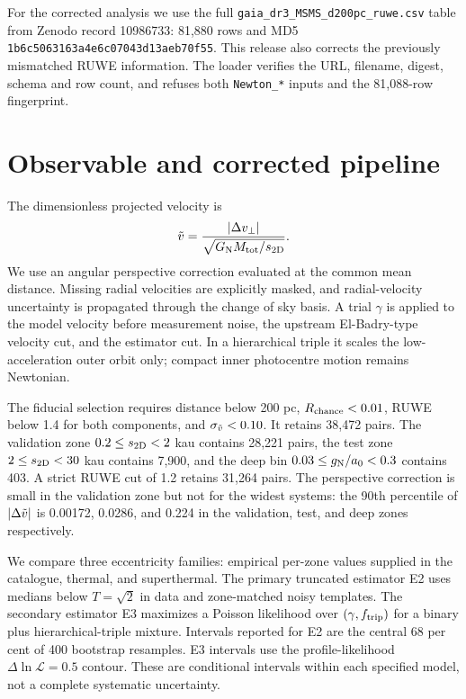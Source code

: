For the corrected analysis we use the full
\texttt{gaia\_dr3\_MSMS\_d200pc\_ruwe.csv} table from Zenodo record 10986733:
81,880 rows and MD5 \texttt{1b6c5063163a4e6c07043d13aeb70f55}.  This release
also corrects the previously mismatched RUWE information.  The loader verifies
the URL, filename, digest, schema and row count, and refuses both
\texttt{Newton\_*} inputs and the 81,088-row fingerprint.

\section{Observable and corrected pipeline}
The dimensionless projected velocity is
\begin{equation}
 \tilde{v}=\frac{|\Delta v_\perp|}{\sqrt{G_{\rm N}M_{\rm tot}/s_{\rm 2D}}}.
\end{equation}
We use an angular perspective correction evaluated at the common mean distance.
Missing radial velocities are explicitly masked, and radial-velocity
uncertainty is propagated through the change of sky basis.  A trial $\gamma$
is applied to the model velocity before measurement noise, the upstream
El-Badry-type velocity cut, and the estimator cut.  In a hierarchical triple it
scales the low-acceleration outer orbit only; compact inner photocentre motion
remains Newtonian.

The fiducial selection requires distance below 200 pc,
$R_{\rm chance}<0.01$, RUWE below 1.4 for both components, and
$\sigma_{\tilde{v}}<0.10$.  It retains 38,472 pairs.  The validation zone
$0.2\le s_{\rm 2D}<2$ kau contains 28,221 pairs, the test zone
$2\le s_{\rm 2D}<30$ kau contains 7,900, and the deep bin
$0.03\le g_{\rm N}/a_0<0.3$ contains 403.  A strict RUWE cut of 1.2 retains 31,264
pairs.  The perspective correction is small in the validation zone but not for
the widest systems: the 90th percentile of $|\Delta\tilde{v}|$ is 0.00172, 0.0286,
and 0.224 in the validation, test, and deep zones respectively.

We compare three eccentricity families: empirical per-zone values supplied in
the catalogue, thermal, and superthermal.  The primary truncated estimator E2
uses medians below $T=\sqrt{2}$ in data and zone-matched noisy templates.  The
secondary estimator E3 maximizes a Poisson likelihood over $(\gamma,f_{\rm trip})$
for a binary plus hierarchical-triple mixture.  Intervals reported for E2 are
the central 68 per cent of 400 bootstrap resamples.  E3 intervals use the
profile-likelihood $\Delta\ln\mathcal L=0.5$ contour.  These are conditional
intervals within each specified model, not a complete systematic uncertainty.

